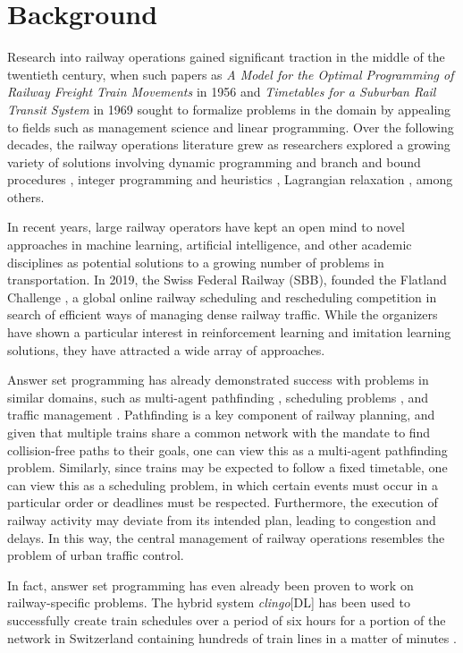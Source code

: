 \section{Background}\label{sec:background}

Research into railway operations gained significant traction in the middle of the twentieth century, when such papers as 
\textit{A Model for the Optimal Programming of Railway Freight Train Movements} in 1956 \cite{chamil56a} and 
\textit{Timetables for a Suburban Rail Transit System} in 1969 \cite{salzborn69a} 
sought to formalize problems in the domain by appealing to fields such as management science and linear programming.
Over the following decades, the railway operations literature grew as researchers explored a growing variety of solutions involving 
dynamic programming and branch and bound procedures \cite{petmer81a}, 
integer programming and heuristics \cite{caigoh94a}, 
Lagrangian relaxation \cite{brlinoni98a}, among others.

In recent years, large railway operators have kept an open mind to novel approaches in 
machine learning, artificial intelligence, and other academic disciplines
as potential solutions to a growing number of problems in transportation.
In 2019, the Swiss Federal Railway (SBB), founded the Flatland Challenge \cite{monylascscbhwaegeibavistsasp20a},
a global online railway scheduling and rescheduling competition
in search of efficient ways of managing dense railway traffic.
While the organizers have shown a particular interest in reinforcement learning and imitation learning solutions,
they have attracted a wide array of approaches.

Answer set programming has already demonstrated success with problems in similar domains, such as 
multi-agent pathfinding \cite{ngobsoscye21a}, 
scheduling problems \cite{bainkaokscsotawa19a} \cite{elgesc22a}, and
traffic management \cite{tamava25a}.
Pathfinding is a key component of railway planning,
and given that multiple trains share a common network with the mandate to find collision-free paths to their goals,
one can view this as a multi-agent pathfinding problem.
Similarly, since trains may be expected to follow a fixed timetable,
one can view this as a scheduling problem, 
in which certain events must occur in a particular order or deadlines must be respected.
Furthermore, the execution of railway activity may deviate from its intended plan, leading to congestion and delays.
In this way, the central management of railway operations resembles the problem of urban traffic control.

In fact, answer set programming has even already been proven to work on railway-specific problems.
The hybrid system \textit{clingo}[DL] has been used to successfully create train schedules 
over a period of six hours for a portion of the network in Switzerland containing hundreds of train lines
in a matter of minutes \cite{abjoossctowa21a}.


%
